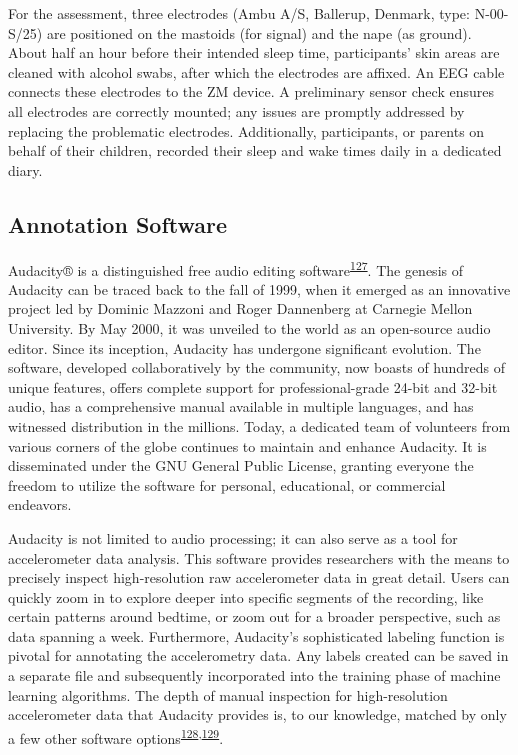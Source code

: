 \documentclass[
  10pt,
]{scrbook}
\begin{document}
For the assessment, three electrodes (Ambu A/S, Ballerup, Denmark, type:
N-00-S/25) are positioned on the mastoids (for signal) and the nape (as
ground). About half an hour before their intended sleep time,
participants' skin areas are cleaned with alcohol swabs, after which the
electrodes are affixed. An EEG cable connects these electrodes to the ZM
device. A preliminary sensor check ensures all electrodes are correctly
mounted; any issues are promptly addressed by replacing the problematic
electrodes. Additionally, participants, or parents on behalf of their
children, recorded their sleep and wake times daily in a dedicated
diary.

\hypertarget{annotation-software}{%
\subsection{Annotation Software}\label{annotation-software}}

Audacity®️ is a distinguished free audio editing
software\textsuperscript{\protect\hyperlink{ref-audacity}{127}}. The
genesis of Audacity can be traced back to the fall of 1999, when it
emerged as an innovative project led by Dominic Mazzoni and Roger
Dannenberg at Carnegie Mellon University. By May 2000, it was unveiled
to the world as an open-source audio editor. Since its inception,
Audacity has undergone significant evolution. The software, developed
collaboratively by the community, now boasts of hundreds of unique
features, offers complete support for professional-grade 24-bit and
32-bit audio, has a comprehensive manual available in multiple
languages, and has witnessed distribution in the millions. Today, a
dedicated team of volunteers from various corners of the globe continues
to maintain and enhance Audacity. It is disseminated under the GNU
General Public License, granting everyone the freedom to utilize the
software for personal, educational, or commercial endeavors.

Audacity is not limited to audio processing; it can also serve as a tool
for accelerometer data analysis. This software provides researchers with
the means to precisely inspect high-resolution raw accelerometer data in
great detail. Users can quickly zoom in to explore deeper into specific
segments of the recording, like certain patterns around bedtime, or zoom
out for a broader perspective, such as data spanning a week.
Furthermore, Audacity's sophisticated labeling function is pivotal for
annotating the accelerometry data. Any labels created can be saved in a
separate file and subsequently incorporated into the training phase of
machine learning algorithms. The depth of manual inspection for
high-resolution accelerometer data that Audacity provides is, to our
knowledge, matched by only a few other software
options\textsuperscript{\protect\hyperlink{ref-visplore}{128},\protect\hyperlink{ref-label_studio}{129}}.
\end{document}
